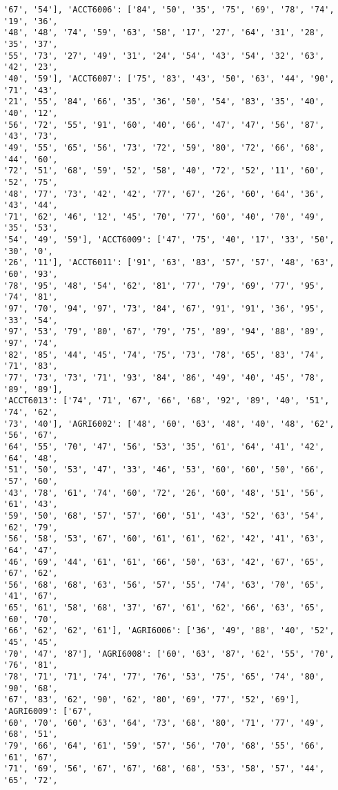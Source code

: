 \documentclass[11pt]{article}
\begin{document}
\begin{Verbatim}[commandchars=\\\{\}]
'67', '54'], 'ACCT6006': ['84', '50', '35', '75', '69', '78', '74', '19', '36',
'48', '48', '74', '59', '63', '58', '17', '27', '64', '31', '28', '35', '37',
'55', '73', '27', '49', '31', '24', '54', '43', '54', '32', '63', '42', '23',
'40', '59'], 'ACCT6007': ['75', '83', '43', '50', '63', '44', '90', '71', '43',
'21', '55', '84', '66', '35', '36', '50', '54', '83', '35', '40', '40', '12',
'56', '72', '55', '91', '60', '40', '66', '47', '47', '56', '87', '43', '73',
'49', '55', '65', '56', '73', '72', '59', '80', '72', '66', '68', '44', '60',
'72', '51', '68', '59', '52', '58', '40', '72', '52', '11', '60', '52', '75',
'48', '77', '73', '42', '42', '77', '67', '26', '60', '64', '36', '43', '44',
'71', '62', '46', '12', '45', '70', '77', '60', '40', '70', '49', '35', '53',
'54', '49', '59'], 'ACCT6009': ['47', '75', '40', '17', '33', '50', '30', '0',
'26', '11'], 'ACCT6011': ['91', '63', '83', '57', '57', '48', '63', '60', '93',
'78', '95', '48', '54', '62', '81', '77', '79', '69', '77', '95', '74', '81',
'97', '70', '94', '97', '73', '84', '67', '91', '91', '36', '95', '33', '54',
'97', '53', '79', '80', '67', '79', '75', '89', '94', '88', '89', '97', '74',
'82', '85', '44', '45', '74', '75', '73', '78', '65', '83', '74', '71', '83',
'77', '73', '73', '71', '93', '84', '86', '49', '40', '45', '78', '89', '89'],
'ACCT6013': ['74', '71', '67', '66', '68', '92', '89', '40', '51', '74', '62',
'73', '40'], 'AGRI6002': ['48', '60', '63', '48', '40', '48', '62', '56', '67',
'64', '55', '70', '47', '56', '53', '35', '61', '64', '41', '42', '64', '48',
'51', '50', '53', '47', '33', '46', '53', '60', '60', '50', '66', '57', '60',
'43', '78', '61', '74', '60', '72', '26', '60', '48', '51', '56', '61', '43',
'59', '50', '68', '57', '57', '60', '51', '43', '52', '63', '54', '62', '79',
'56', '58', '53', '67', '60', '61', '61', '62', '42', '41', '63', '64', '47',
'46', '69', '44', '61', '61', '66', '50', '63', '42', '67', '65', '67', '62',
'56', '68', '68', '63', '56', '57', '55', '74', '63', '70', '65', '41', '67',
'65', '61', '58', '68', '37', '67', '61', '62', '66', '63', '65', '60', '70',
'66', '62', '62', '61'], 'AGRI6006': ['36', '49', '88', '40', '52', '45', '45',
'70', '47', '87'], 'AGRI6008': ['60', '63', '87', '62', '55', '70', '76', '81',
'78', '71', '71', '74', '77', '76', '53', '75', '65', '74', '80', '90', '68',
'67', '83', '62', '90', '62', '80', '69', '77', '52', '69'], 'AGRI6009': ['67',
'60', '70', '60', '63', '64', '73', '68', '80', '71', '77', '49', '68', '51',
'79', '66', '64', '61', '59', '57', '56', '70', '68', '55', '66', '61', '67',
'71', '69', '56', '67', '67', '68', '68', '53', '58', '57', '44', '65', '72',

\end{Verbatim}
\end{document}
